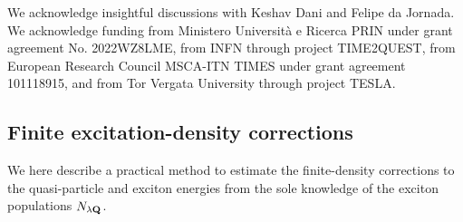 \documentclass[twocolumn,aps,a4paper,superscriptaddress]{revtex4-2}
\begin{document}
\acknowledgments

We acknowledge insightful discussions with Keshav Dani and Felipe da
Jornada.
We acknowledge funding from Ministero Universit\`a e
Ricerca PRIN under grant agreement No. 2022WZ8LME,
from INFN through project TIME2QUEST,
from European Research Council MSCA-ITN TIMES under grant agreement 101118915,
and from Tor Vergata University through project TESLA.



\appendix
\begin{widetext}

\section{Finite excitation-density corrections}
\label{findensapp}

We here describe a practical method to estimate the finite-density
corrections to the quasi-particle and exciton energies from the sole
knowledge of the exciton populations $N_{\lambda{\mathbf Q}}$.


\end{widetext}
\end{document}
